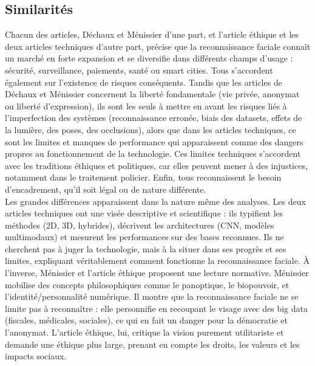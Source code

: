 \documentclass[11pt]{article}
\begin{document}
\subsection{Similarités}
Chacun des articles, Déchaux et Ménissier d’une part, et l’article éthique et les deux articles techniques d’autre part, précise 
que la reconnaissance faciale connaît un marché en forte expansion et se diversifie dans différents champs d’usage : sécurité, 
surveillance, paiements, santé ou smart cities. Tous s’accordent également sur l’existence de risques conséquents. Tandis que 
les articles de Déchaux et Ménissier concernent la liberté fondamentale (vie privée, anonymat ou liberté d’expression), ils sont 
les seuls à mettre en avant les risques liés à l’imperfection des systèmes (reconnaissance erronée, biais des datasets, effets 
de la lumière, des poses, des occlusions), alors que dans les articles techniques, ce sont les limites et manques de performance 
qui apparaissent comme des dangers propres au fonctionnement de la technologie. Ces limites techniques s’accordent avec les 
traditions éthiques et politiques, car elles peuvent mener à des injustices, notamment dans le traitement policier. Enfin, tous 
reconnaissent le besoin d’encadrement, qu’il soit légal ou de nature différente.\\
Les grandes différences apparaissent dans la nature même des analyses. Les deux articles techniques ont une visée descriptive et 
scientifique : ils typifient les méthodes (2D, 3D, hybrides), décrivent les architectures (CNN, modèles multimodaux) et mesurent 
les performances sur des bases reconnues. Ils ne cherchent pas à juger la technologie, mais à la situer dans ses progrès et ses 
limites, expliquant véritablement comment fonctionne la reconnaissance faciale. À l’inverse, Ménissier et l’article éthique 
proposent une lecture normative. Ménissier mobilise des concepts philosophiques comme le panoptique, le biopouvoir, et 
l’identité/personnalité numérique. Il montre que la reconnaissance faciale ne se limite pas à reconnaître : elle personnifie en 
recoupant le visage avec des big data (fiscales, médicales, sociales), ce qui en fait un danger pour la démocratie et 
l’anonymat. L’article éthique, lui, critique la vision purement utilitariste et demande une éthique plus large, prenant en 
compte les droits, les valeurs et les impacts sociaux.
\end{document}
